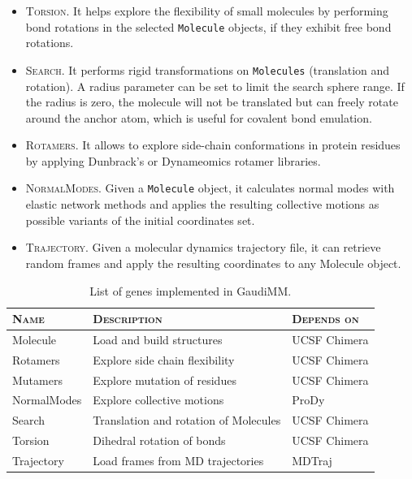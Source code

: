 \begin{itemize}
	\item \textsc{Torsion}. It helps explore the flexibility of small molecules by performing bond rotations in the selected \texttt{Molecule} objects, if they exhibit free bond rotations.

	\item \textsc{Search}. It performs rigid transformations on \texttt{Molecules} (translation and rotation). A radius parameter can be set to limit the search sphere range. If the radius is zero, the molecule will not be translated but can freely rotate around the anchor atom, which is useful for covalent bond emulation.

	\item \textsc{Rotamers}. It allows to explore side-chain conformations in protein residues by applying Dunbrack's\cite{dunbrack1993backbone} or Dynameomics\cite{scouras2011dynameomics} rotamer libraries.

	\item \textsc{NormalModes}. Given a \texttt{Molecule} object, it calculates normal modes with elastic network methods and applies the resulting collective motions as possible variants of the initial coordinates set.

	\item \textsc{Trajectory}. Given a molecular dynamics trajectory file, it can retrieve random frames and apply the resulting coordinates to any Molecule object.
\end{itemize}


\begin{table}[hbtp]
	\caption[List of genes implemented in GaudiMM]{List of genes implemented in GaudiMM.}
	\label{table:gaudi-genes}
\footnotesize
{}%
%
%
\begin{tabularx}{\textwidth}{LMR}
\toprule
\textsc{Name} & \textsc{Description} & \textsc{Depends on} \\
\toprule
 Molecule & Load and build structures & UCSF Chimera \\
\hhline{~~~}
 Rotamers & Explore side chain flexibility & UCSF Chimera \\
\hhline{~~~}
 Mutamers & Explore mutation of residues & UCSF Chimera \\
\hhline{~~~}
 NormalModes & Explore collective motions & ProDy\cite{prody} \\
\hhline{~~~}
 Search & Translation and rotation of Molecules & UCSF Chimera \\
\hhline{~~~}
 Torsion & Dihedral rotation of bonds & UCSF Chimera \\
\hhline{~~~}
 Trajectory & Load frames from MD trajectories & MDTraj\cite{mdtraj} \\
\bottomrule
\end{tabularx}
\end{table}


